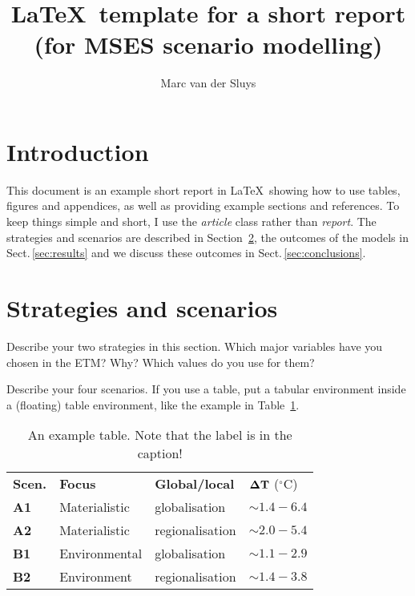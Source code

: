 \documentclass[11pt]{article}
\title{\LaTeX\ template for a short report (for MSES scenario modelling)}
\author{Marc van der Sluys}
\begin{document}
\maketitle

\tableofcontents


\section{Introduction}
\label{sec:intro}

This document is an example short report in \LaTeX\ showing how to use tables, figures and appendices, as well
as providing example sections and references.  To keep things simple and short, I use the \emph{article} class
rather than \emph{report}.  The strategies and scenarios are described in Section~\ref{sec:scenarios}, the
outcomes of the models in Sect.\,\ref{sec:results} and we discuss these outcomes in
Sect.\,\ref{sec:conclusions}.


\section{Strategies and scenarios}
\label{sec:scenarios}

Describe your two strategies in this section.  Which major variables have you chosen in the
ETM?  Why?  Which values do you use for them?

Describe your four scenarios.  If you use a table, put a tabular environment inside a (floating) table
environment, like the example in Table~\ref{tab:example}.

\begin{table}
  \centering
  \begin{tabular}{llll}
    \textbf{Scen.} & \textbf{Focus} & \textbf{Global/local} & $\bf \Delta T$ ($^\circ$C) \\
    \textbf{A1}    &  Materialistic & globalisation         & $\sim 1.4 - 6.4$ \\
    \textbf{A2}    &  Materialistic & regionalisation       & $\sim 2.0 - 5.4$ \\
    \textbf{B1}    &  Environmental & globalisation         & $\sim 1.1 - 2.9$ \\
    \textbf{B2}    &  Environment   & regionalisation       & $\sim 1.4 - 3.8$ \\
  \end{tabular}
  \caption{An example table.  Note that the label is in the caption!
    \label{tab:example}
  }
\end{table}
\end{document}
